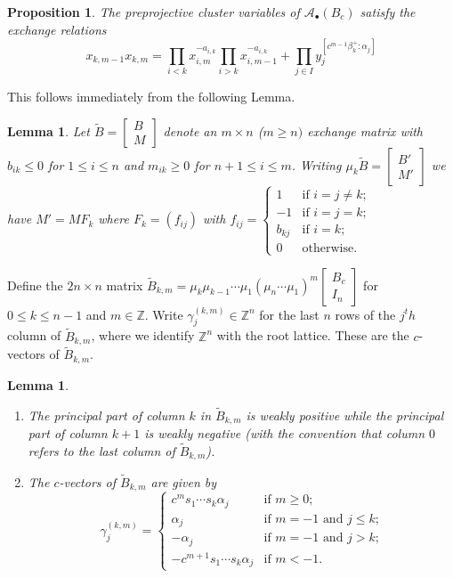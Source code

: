 \documentclass[12pt]{amsart}
\newcommand{\cAb}{\mathcal{A}_\bullet}
\newcommand{\ZZ}{\mathbb{Z}}
\newtheorem{lemma}[theorem]{Lemma}
\newtheorem{proposition}[theorem]{Proposition}
\theoremstyle{remark}
\numberwithin{equation}{section}
\begin{document}
\begin{proposition}
  The preprojective cluster variables of $\cAb(B_c)$ satisfy the exchange relations
  \begin{equation}
    x_{k,m-1}x_{k,m} = \prod_{i<k}x_{i,m}^{-a_{i,k}} \prod_{i>k}x_{i,m-1}^{-a_{i,k}} + \prod_{j\in I}y_j^{[c^{m-1}\beta_k^+:\alpha_j]}
  \end{equation}
\end{proposition}
This follows immediately from the following Lemma.
\begin{lemma}\label{le:positive mutations}
  Let $\tilde B=\left[\begin{array}{c} B\\ M\end{array}\right]$ denote an $m\times n$ ($m\ge n)$ exchange matrix with $b_{ik}\le0$ for $1\le i\le n$ and $m_{ik}\ge0$ for $n+1\le i\le m$.  Writing $\mu_k\tilde B=\left[\begin{array}{c} B'\\ M'\end{array}\right]$ we have $M'=MF_k$ where $F_k=(f_{ij})$ with $f_{ij}=\begin{cases}1 & \text{if $i=j\ne k$;}\\ -1 & \text{if $i=j=k$;}\\ b_{kj} & \text{if $i=k$;}\\ 0 & \text{otherwise.}\end{cases}$
\end{lemma}
Define the $2n\times n$ matrix $\tilde B_{k,m}=\mu_k\mu_{k-1}\cdots\mu_1(\mu_n\cdots\mu_1)^m\left[\begin{array}{c} B_c\\ I_n\end{array}\right]$ for $0\le k\le n-1$ and $m\in\ZZ$.  Write $\gamma^{(k,m)}_j\in\ZZ^n$ for the last $n$ rows of the $j^th$ column of $\tilde B_{k,m}$, where we identify $\ZZ^n$ with the root lattice.  These are the $c$-vectors of $\tilde B_{k,m}$.
\begin{lemma}\mbox{}
  \begin{enumerate}
    \item The principal part of column $k$ in $\tilde B_{k,m}$ is weakly positive while the principal part of column $k+1$ is weakly negative (with the convention that column $0$ refers to the last column of $\tilde B_{k,m}$).
    \item The $c$-vectors of $\tilde B_{k,m}$ are given by 
    \[\gamma^{(k,m)}_j=\begin{cases}c^m s_1\cdots s_k\alpha_j & \text{if $m\ge0$;}\\\alpha_j & \text{if $m=-1$ and $j\le k$;}\\-\alpha_j & \text{if $m=-1$ and $j>k$;}\\-c^{m+1} s_1\cdots s_k\alpha_j & \text{if $m<-1$.}\end{cases}\]
  \end{enumerate}
\end{lemma}
\end{document}
